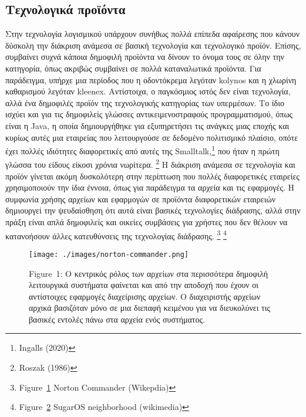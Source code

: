 \documentclass[
]{article}
\begin{document}
\hypertarget{ux3c4ux3b5ux3c7ux3bdux3bfux3bbux3bfux3b3ux3b9ux3baux3ac-ux3c0ux3c1ux3bfux3caux3ccux3bdux3c4ux3b1}{%
\subsection{Τεχνολογικά
προϊόντα}\label{ux3c4ux3b5ux3c7ux3bdux3bfux3bbux3bfux3b3ux3b9ux3baux3ac-ux3c0ux3c1ux3bfux3caux3ccux3bdux3c4ux3b1}}

Στην τεχνολογία λογισμικού υπάρχουν συνήθως πολλά επίπεδα αφαίρεσης που
κάνουν δύσκολη την διάκριση ανάμεσα σε βασική τεχνολογία και τεχνολογικό
προϊόν. Επίσης, συμβαίνει συχνά κάποια δημοφιλή προϊόντα να δίνουν το
όνομα τους σε όλην την κατηγορία, όπως ακριβώς συμβαίνει σε πολλά
καταναλωτικά προϊόντα. Για παράδειγμα, υπήρχε μια περίοδος που η
οδοντόκρεμα λεγόταν kolynos και η χλωρίνη καθαρισμού λεγόταν kleenex.
Αντίστοιχα, ο παγκόσμιος ιστός δεν είναι τεχνολογία, αλλά ένα δημοφιλές
προϊόν της τεχνολογικής κατηγορίας των υπερμέσων. Το ίδιο ισχύει και για
τις δημοφιλείς γλώσσες αντικειμενοστραφούς προγραμματισμού, όπως είναι η
Java, η οποία δημιουργήθηκε για εξυπηρετήσει τις ανάγκες μιας εποχής και
κυρίως αυτές μια εταιρείας που λειτουργούσε σε δεδομένο πολιτισμικό
πλαίσιο, οπότε έχει πολλές ιδιότητες διαφορετικές από αυτές της
Smalltalk,\footnote{Ingalls (2020)} που ήταν η πρώτη γλώσσα του είδους
είκοσι χρόνια νωρίτερα. \footnote{Roszak (1986)} Η διάκριση ανάμεσα σε
τεχνολογία και προϊόν γίνεται ακόμη δυσκολότερη στην περίπτωση που
πολλές διαφορετικές εταιρείες χρησιμοποιούν την ίδια έννοια, όπως για
παράδειγμα τα αρχεία και τις εφαρμογές. Η συμφωνία χρήσης αρχείων και
εφαρμογών σε προϊόντα διαφορετικών εταιρειών δημιουργεί την ψευδαίσθηση
ότι αυτά είναι βασικές τεχνολογίες διάδρασης, αλλά στην πράξη είναι απλά
δημοφιλείς και οικείες συμβάσεις για χρήστες που δεν θέλουν να
κατανοήσουν άλλες κατευθύνσεις της τεχνολογίας διάδρασης. \footnote{Figure~\protect\hyperlink{fig:norton-commander}{1}
  Norton Commander (Wikepdia)} \footnote{Figure~\protect\hyperlink{fig:sugar-neighborhood}{2}
  SugarOS neighborhood (wikimedia)}

\leavevmode{}%
\begin{figure}
\hypertarget{fig:norton-commander}{%
\centering
\texttt{[image: ./images/norton-commander.png]}
\caption{Figure~1: Ο κεντρικός ρόλος των αρχείων στα περισσότερα
δημοφιλή λειτουργικά συστήματα φαίνεται και από την αποδοχή που έχουν οι
αντίστοιχες εφαρμογές διαχείρισης αρχείων. Ο διαχειριστής αρχείων αρχικά
βασιζόταν μόνο σε μια διεπαφή κειμένου για να διευκολύνει τις βασικές
εντολές πάνω στα αρχεία ενός συστήματος.}\label{fig:norton-commander}
}
\end{figure}
\end{document}
